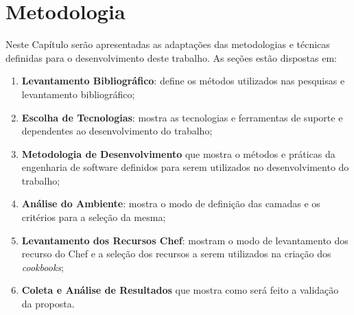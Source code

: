 \newpage\null\thispagestyle{empty}\newpage
\chapter{Metodologia}
\label{chap:metod}

Neste Capítulo serão apresentadas as adaptações das metodologias e técnicas
definidas para o desenvolvimento deste trabalho. As seções estão dispostas
em:

\begin{enumerate}
  \item \textbf{Levantamento Bibliográfico}: define os métodos utilizados nas
    pesquisas e levantamento bibliográfico;
  \item \textbf{Escolha de Tecnologias}: mostra as tecnologias e
    ferramentas de suporte e dependentes ao desenvolvimento do trabalho;
  \item \textbf{Metodologia de Desenvolvimento} que mostra o métodos e práticas da engenharia de software
    definidos para serem utilizados no desenvolvimento do trabalho;
  \item \textbf{Análise do Ambiente}: mostra o modo de definição das camadas e os critérios para
    a seleção da mesma;
  \item \textbf{Levantamento dos Recursos Chef}: mostram o modo de levantamento dos recurso do Chef
    e a seleção dos recursos a serem utilizados na criação dos \textit{cookbooks};
  \item \textbf{Coleta e Análise de Resultados} que mostra como será feito a validação da proposta.
\end{enumerate}







